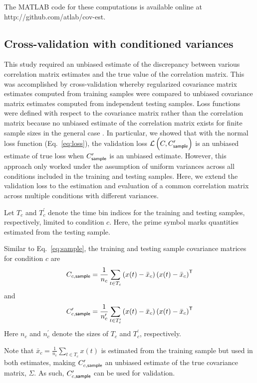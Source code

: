 The MATLAB code for these computations is available online at http://github.com/atlab/cov-est.
\subsection*{Cross-validation with conditioned variances}
This study required an unbiased estimate of the discrepancy between various correlation matrix estimates and the true value of the correlation matrix. This was accomplished by cross-validation whereby regularized covariance matrix estimates computed from training samples were compared to unbiased covariance matrix estimates computed from independent testing samples. Loss functions were defined with respect to the covariance matrix rather than the correlation matrix because no unbiased estimate of the correlation matrix exists for finite sample sizes in the general case \cite{Fisher:1921}. In particular, we showed that with the normal loss function (Eq.~\ref{eq:loss}), the validation loss $\mathcal L\left(C,C_{\sf sample}^\prime\right)$ is an unbiased estimate of true loss when $C_{\sf sample}^\prime$ is an unbiased estimate. However, this approach only worked under the assumption of uniform variances across all conditions included in the training and testing samples.  Here, we extend the validation loss to the estimation and evaluation of a common correlation matrix across multiple conditions with different variances.

Let $T_c$ and $T_c^\prime$ denote the time bin indices for the training and testing samples, respectively, limited to condition $c$. Here, the prime symbol marks quantities estimated from the testing sample.

Similar to Eq.~\ref{eq:sample}, the training and testing sample covariance matrices for condition $c$ are
\begin{equation}
    C_{c,{\sf sample}}
    = \frac 1{n_c} \sum\limits_{t\in T_c}\left(x(t)-\bar x_c\right)\left(x(t)-\bar x_c\right)^{\sf T}
\end{equation}
and
\begin{equation}
    C_{c,{\sf sample}}^\prime
    = \frac 1{n_c^\prime} \sum\limits_{t\in T_c^\prime}\left(x(t)-\bar x_c\right)\left(x(t)-\bar x_c\right)^{\sf T}
\end{equation}
Here $n_c$ and $n_c^\prime$ denote the sizes of $T_c$ and $T_c^\prime$, respectively.

Note that $\bar x_c= \frac 1 {n_c} \sum\limits_{t \in T_c}x(t)$ is estimated from the training sample but used in both estimates, making $C_{c,\sf sample}^\prime$ an unbiased estimate of the true covariance matrix, $\Sigma$. As such, $C_{c,\sf sample}^\prime$ can be used for validation.

